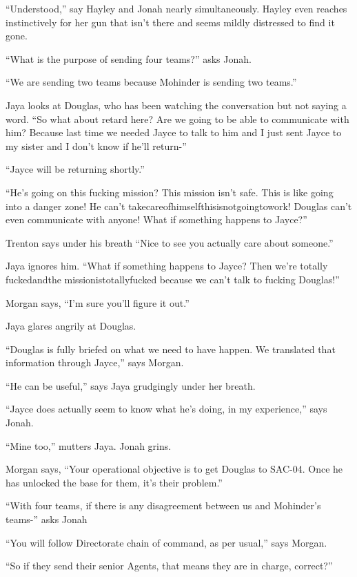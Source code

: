 ``Understood,'' say Hayley and Jonah nearly simultaneously.  Hayley even reaches instinctively for her gun that isn't there and seems mildly distressed to find it gone.

``What is the purpose of sending four teams?'' asks Jonah.

``We are sending two teams because Mohinder is sending two teams.''

Jaya looks at Douglas, who has been watching the conversation but not saying a word.  ``So what about retard here?  Are we going to be able to communicate with him?  Because last time we needed Jayce to talk to him and I just sent Jayce to my sister and I don't know if he'll return-''

``Jayce will be returning shortly.''

``He's going on this fucking mission?  This mission isn't safe.  This is like going into a danger zone!  He can't takecareofhimselfthisisnotgoingtowork!  Douglas can't even communicate with anyone!  What if something happens to Jayce?''

Trenton says under his breath ``Nice to see you actually care about someone.''  

Jaya ignores him.  ``What if something happens to Jayce?  Then we're totally fuckedandthe missionistotallyfucked because we can't talk to fucking Douglas!''

Morgan says, ``I'm sure you'll figure it out.''

Jaya glares angrily at Douglas.

``Douglas is fully briefed on what we need to have happen.  We translated that information through Jayce,'' says Morgan.

``He can be useful,'' says Jaya grudgingly under her breath.

``Jayce does actually seem to know what he's doing, in my experience,'' says Jonah.

``Mine too,'' mutters Jaya.  Jonah grins.

Morgan says, ``Your operational objective is to get Douglas to SAC-04.  Once he has unlocked the base for them, it's their problem.''

``With four teams, if there is any disagreement between us and Mohinder's teams-'' asks Jonah

``You will follow Directorate chain of command, as per usual,'' says Morgan.

``So if they send their senior Agents, that means they are in charge, correct?''

